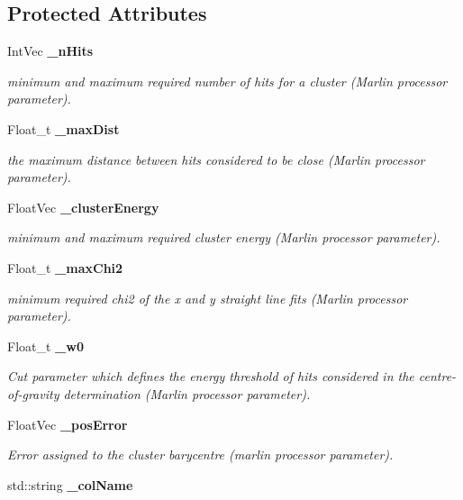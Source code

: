 \subsection*{Protected Attributes}
\begin{DoxyCompactItemize}
\item 
IntVec {\bf \_\-nHits}
\begin{DoxyCompactList}\small\item\em minimum and maximum required number of hits for a cluster (Marlin processor parameter). \item\end{DoxyCompactList}\item 
Float\_\-t {\bf \_\-maxDist}
\begin{DoxyCompactList}\small\item\em the maximum distance between hits considered to be close (Marlin processor parameter). \item\end{DoxyCompactList}\item 
FloatVec {\bf \_\-clusterEnergy}
\begin{DoxyCompactList}\small\item\em minimum and maximum required cluster energy (Marlin processor parameter). \item\end{DoxyCompactList}\item 
Float\_\-t {\bf \_\-maxChi2}
\begin{DoxyCompactList}\small\item\em minimum required chi2 of the x and y straight line fits (Marlin processor parameter). \item\end{DoxyCompactList}\item 
Float\_\-t {\bf \_\-w0}
\begin{DoxyCompactList}\small\item\em Cut parameter which defines the energy threshold of hits considered in the centre-\/of-\/gravity determination (Marlin processor parameter). \item\end{DoxyCompactList}\item 
FloatVec {\bf \_\-posError}
\begin{DoxyCompactList}\small\item\em Error assigned to the cluster barycentre (marlin processor parameter). \item\end{DoxyCompactList}\item 
std::string {\bf \_\-colName}\label{classCALICE_1_1MipSelect_ac9ae37843e4f13fdb0339917b36e3bb9}


\end{DoxyCompactItemize}
